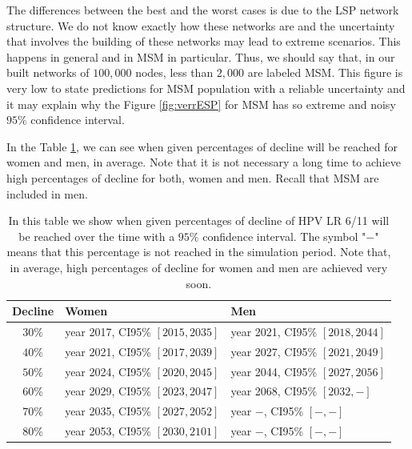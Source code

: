The differences between the best and the worst cases is due to the LSP network structure. We do not know exactly how these networks are and the uncertainty that involves the building of these networks may lead to extreme scenarios. This happens in general and in MSM in particular. Thus, we should say that, in our built networks of $100,000$ nodes, less than $2,000$ are labeled MSM. This figure is very low to state predictions for MSM population with a reliable uncertainty and it may explain why the Figure \ref{fig:verrESP} for MSM has so extreme and noisy $95\%$ confidence interval.

In the Table \ref{tabla:verrESP}, we can see when given percentages of decline will be reached for women and men, in average. Note that it is not necessary a long time to achieve high percentages of decline for both, women and men. Recall that MSM are included in men.

\begin{table}[!h]
\centering
\begin{tabular}{c|ll}
	Decline & Women & Men  \\ 
	\hline 
$ 30 \%$ & year 2017, CI95\% $[2015, 2035]$ & year 2021, CI95\% $[2018, 2044 ]$  \\
$ 40 \%$ & year 2021, CI95\% $[2017, 2039]$ & year 2027, CI95\% $[2021, 2049 ]$  \\	
$ 50 \%$ & year 2024, CI95\% $[2020, 2045]$ & year 2044, CI95\% $[2027, 2056 ]$  \\
$ 60 \%$ & year 2029, CI95\% $[2023, 2047]$ & year 2068, CI95\% $[2032, - ]$  \\
$ 70 \%$ & year 2035, CI95\% $[2027, 2052]$ & year $-$, CI95\% $[- ,-]$  \\
$ 80 \%$ & year 2053, CI95\% $[2030, 2101]$ & year $-$, CI95\% $[-, -]$  \\
\end{tabular} 
\caption{In this table we show when given percentages of decline of HPV LR 6/11 will be reached over the time with a $95\%$ confidence interval. The symbol "$-$" means that this percentage is not reached in the simulation period. Note that, in average, high percentages of decline for women and men are achieved very soon.}
\label{tabla:verrESP}
\end{table}

